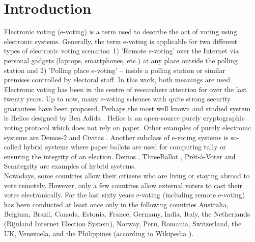 \chapter{Introduction}

Electronic voting (e-voting) is a term used to describe the act of voting using electronic systems. Generally, the term e-voting is applicable for two different types of electronic voting scenarios:  1) 'Remote e-voting'  over the Internet via personal gadgets (laptops, smartphones, etc.) at any place outside the polling station and  2) 'Polling place e-voting' --  inside a polling station or similar premises controlled by electoral staff. In this work, both meanings are used.\\

Electronic voting has been in the centre of researchers attention for over the last twenty years. Up to now, many e-voting schemes with quite strong security guarantees have been proposed. Perhaps the most well known and studied system is Helios designed by Ben Adida \cite{Adida2008}.  Helios is an open-source purely cryptographic voting protocol which does not rely on paper. Other examples of purely electronic systems are Demos-2 \cite{Kiayias2015} and Civitas \cite{Clarkson2008}.  Another subclass of e-voting systems is so-called hybrid systems where paper ballots are used for computing tally or ensuring the integrity of an election. Demos \cite{Kiayias2015a}, ThreeBallot \cite{Rivest2006}, Pr\^{e}t-\`a-Voter \cite{Ryan2006} and Scantegrity \cite{Chaum2009} are examples of hybrid systems.  \\

Nowadays, some countries allow their citizens who are living or staying abroad to vote remotely. However, only a few countries allow external voters to cast their votes electronically. For the last sixty years e-voting (including remote e-voting) has been conducted at least once only in the following countries Australia, Belgium, Brazil, Canada, Estonia, France, Germany, India, Italy, the Netherlands (Rijnland Internet Election System), Norway, Peru, Romania, Switzerland, the UK, Venezuela, and the Philippines (according to Wikipedia \cite{wiki}).\\

